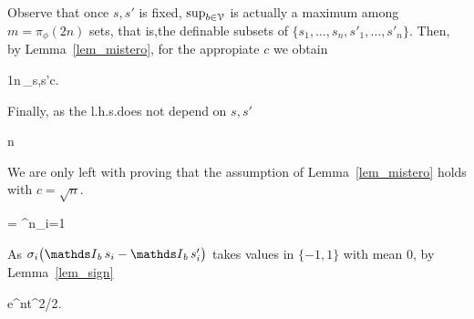 \documentclass[scombinatorics.tex]{subfiles}
\begin{document}
Observe that once $s,s'$ is fixed, $\sup_{b\in\EuScript V}$ is actually a maximum among $m=\pi_\phi(2n)$ sets, that is,the definable subsets of $\{s_1,\dots,s_n,s'_1,\dots,s'_n\}$.
Then, by Lemma~\ref{lem_mistero}, for the appropiate $c$ we obtain

\ceq{}
{\le}
{\frac1n\,\sup_{s,s'}c.}

Finally, as the l.h.s.\@ does not depend on $s,s'$

\ceq{}
{\le}
{n}

We are only left with proving that the assumption of Lemma~\ref{lem_mistero} holds with $c=\sqrt{n}$.

\ceq{\hfill\Ex\bigg[\exp\bigg(t\sum^n_{i=1} \sigma_i\big(\Indicator_b\,s_i -  \Indicator_b\,s'_i\big)\bigg)\bigg]}
{=}
{\prod^n_{i=1} \Ex{}}

As $\sigma_i\big(\Indicator_b\,s_i -  \Indicator_b\,s'_i\big)$ takes values in $\{-1,1\}$ with mean $0$, by Lemma~\ref{lem_sign}

\ceq{}
{\le}
{e^{nt^2/2}.}\QED
\end{document}

